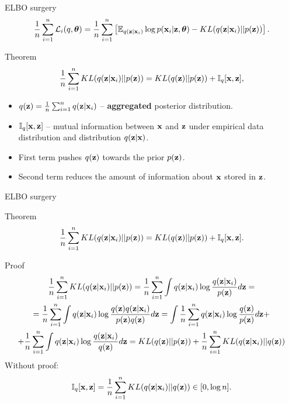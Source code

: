 \begin{frame}{ELBO surgery}
	\vspace{-0.3cm}
	\[
	    \frac{1}{n} \sum_{i=1}^n \mathcal{L}_i(q, \boldsymbol{\theta}) = \frac{1}{n} \sum_{i=1}^n \left[ \mathbb{E}_{q(\mathbf{z} | \mathbf{x}_i)} \log p(\mathbf{x}_i | \mathbf{z}, \boldsymbol{\theta}) - KL(q(\mathbf{z} | \mathbf{x}_i) || p(\mathbf{z})) \right].
	\]
	\vspace{-0.3cm}
	\begin{block}{Theorem}
		\[
		    \frac{1}{n} \sum_{i=1}^n KL(q(\mathbf{z} | \mathbf{x}_i) || p(\mathbf{z})) = KL(q(\mathbf{z}) || p(\mathbf{z})) + \mathbb{I}_{q} [\mathbf{x}, \mathbf{z}],
		\]
		\begin{itemize}
			\item $q(\mathbf{z}) = \frac{1}{n} \sum_{i=1}^n q(\mathbf{z} | \mathbf{x}_i)$ -- \textbf{aggregated} posterior distribution.
			\item $\mathbb{I}_{q} [\mathbf{x}, \mathbf{z}]$ -- mutual information between $\mathbf{x}$ and $\mathbf{z}$ under empirical data distribution and distribution $q(\mathbf{z} | \mathbf{x})$.
			\item First term pushes $q(\mathbf{z})$ towards the prior $p(\mathbf{z})$.
			\item Second term reduces the amount of	information about $\mathbf{x}$ stored in $\mathbf{z}$. 
		\end{itemize}
	\end{block}
\end{frame}
\begin{frame}{ELBO surgery}
	\begin{block}{Theorem}
		\vspace{-0.3cm}
		\[
		    \frac{1}{n} \sum_{i=1}^n KL(q(\mathbf{z} | \mathbf{x}_i) || p(\mathbf{z})) = KL(q(\mathbf{z}) || p(\mathbf{z})) + \mathbb{I}_q [\mathbf{x}, \mathbf{z}].
		\]
		\vspace{-0.4cm}
	\end{block}
	\begin{block}{Proof}
		\vspace{-0.5cm}
		{\footnotesize
		\begin{multline*}
		    \frac{1}{n} \sum_{i=1}^n KL(q(\mathbf{z} | \mathbf{x}_i) || p(\mathbf{z})) = \frac{1}{n} \sum_{i=1}^n \int q(\mathbf{z} | \mathbf{x}_i) \log \frac{q(\mathbf{z} | \mathbf{x}_i)}{p(\mathbf{z})} d \mathbf{z} = \\
		    = \frac{1}{n} \sum_{i=1}^n \int q(\mathbf{z} | \mathbf{x}_i) \log \frac{q(\mathbf{z}) q(\mathbf{z} | \mathbf{x}_i)}{p(\mathbf{z})q(\mathbf{z})} d \mathbf{z} 
		    = \int \frac{1}{n} \sum_{i=1}^n  q(\mathbf{z} | \mathbf{x}_i) \log \frac{q(\mathbf{z})}{p(\mathbf{z})} d \mathbf{z} + \\ 
		    + \frac{1}{n}\sum_{i=1}^n \int q(\mathbf{z} | \mathbf{x}_i) \log \frac{q(\mathbf{z} | \mathbf{x}_i)}{q(\mathbf{z})} d \mathbf{z} = 
		     KL (q(\mathbf{z}) || p(\mathbf{z})) + \frac{1}{n}\sum_{i=1}^n KL(q(\mathbf{z} | \mathbf{x}_i) || q (\mathbf{z}))
		\end{multline*}
		}
		Without proof:
		\vspace{-0.4cm}
		\[
			\mathbb{I}_{q} [\mathbf{x}, \mathbf{z}] = \frac{1}{n}\sum_{i=1}^n KL(q(\mathbf{z} | \mathbf{x}_i) || q (\mathbf{z})) \in [0, \log n].
		\]
	\end{block}

\end{frame}
